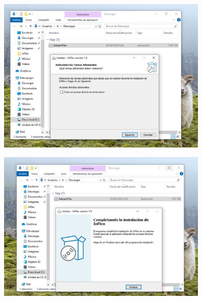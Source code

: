 \begin{figure}[!h]
  \includegraphics*[width=0.9\textwidth]{images/apb04.png}
\end{figure}
\begin{figure}[!h]
  \includegraphics*[width=0.9\textwidth]{images/apb05.png}
\end{figure}

\chapter*{}
\vspace*{-5em}
